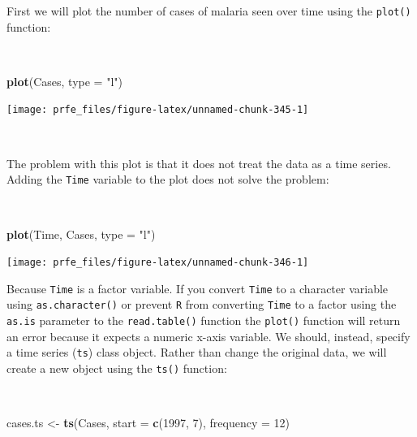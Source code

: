 \documentclass[12pt,a4paper]{book}
\newenvironment{Shaded}{\begin{snugshade}}{\end{snugshade}}
\newcommand{\KeywordTok}[1]{\textcolor[rgb]{0.13,0.29,0.53}{\textbf{#1}}}
\newcommand{\DataTypeTok}[1]{\textcolor[rgb]{0.13,0.29,0.53}{#1}}
\newcommand{\DecValTok}[1]{\textcolor[rgb]{0.00,0.00,0.81}{#1}}
\newcommand{\StringTok}[1]{\textcolor[rgb]{0.31,0.60,0.02}{#1}}
\newcommand{\NormalTok}[1]{#1}
\theoremstyle{definition}
\theoremstyle{definition}
\theoremstyle{definition}
\theoremstyle{remark}
\begin{document}
\newpage

First we will plot the number of cases of malaria seen over time using
the \texttt{plot()} function:

~

\begin{Shaded}
\begin{Highlighting}[]
\KeywordTok{plot}\NormalTok{(Cases, }\DataTypeTok{type =} \StringTok{"l"}\NormalTok{)}
\end{Highlighting}
\end{Shaded}

\begin{center}\texttt{[image: prfe\_files/figure-latex/unnamed-chunk-345-1]} \end{center}

~

The problem with this plot is that it does not treat the data as a time
series. Adding the \texttt{Time} variable to the plot does not solve the
problem:

~

\begin{Shaded}
\begin{Highlighting}[]
\KeywordTok{plot}\NormalTok{(Time, Cases, }\DataTypeTok{type =} \StringTok{"l"}\NormalTok{)}
\end{Highlighting}
\end{Shaded}

\begin{center}\texttt{[image: prfe\_files/figure-latex/unnamed-chunk-346-1]} \end{center}

\newpage

Because \texttt{Time} is a factor variable. If you convert \texttt{Time}
to a character variable using \texttt{as.character()} or prevent
\texttt{R} from converting \texttt{Time} to a factor using the
\texttt{as.is} parameter to the \texttt{read.table()} function the
\texttt{plot()} function will return an error because it expects a
numeric x-axis variable. We should, instead, specify a time series
(\texttt{ts}) class object. Rather than change the original data, we
will create a new object using the \texttt{ts()} function:

~

\begin{Shaded}
\begin{Highlighting}[]
\NormalTok{cases.ts <-}\StringTok{ }\KeywordTok{ts}\NormalTok{(Cases, }\DataTypeTok{start =} \KeywordTok{c}\NormalTok{(}\DecValTok{1997}\NormalTok{, }\DecValTok{7}\NormalTok{), }\DataTypeTok{frequency =} \DecValTok{12}\NormalTok{)}
\end{Highlighting}
\end{Shaded}
\end{document}
